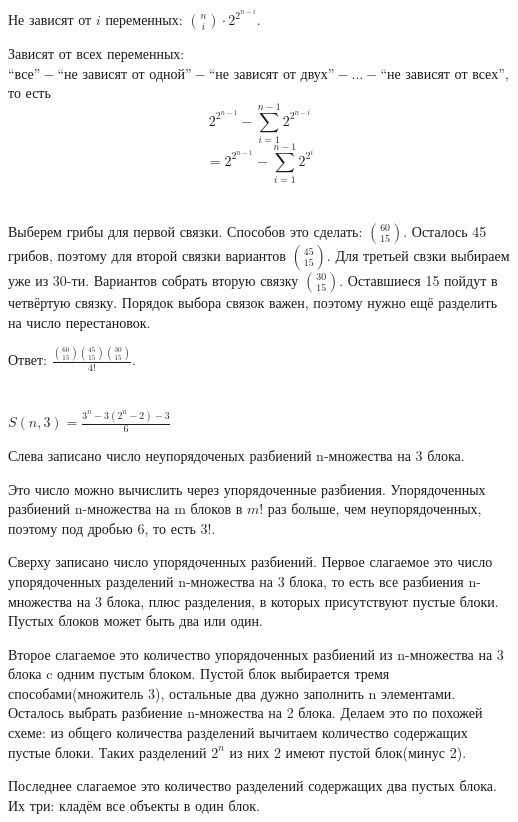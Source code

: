 \documentclass{article}
\begin{document}
Не зависят от $i$ переменных: ${n\choose i} \cdot 2^{2^{n-i}}$.

Зависят от всех переменных: $\text{``все''} - \text{``не зависят от одной''} -
\text{``не зависят от двух''} - \ldots - \text{``не зависят от всех''}$, то
есть $$2^{2^{n-1}}-\sum_{i=1}^{n-1}{2^{2^{n-i}}} $$ $$=
2^{2^{n-1}}-\sum_{i=1}^{n-1}{2^{2^{i}}}$$

\section{}

Выберем грибы для первой связки. Способов это сделать: ${60\choose
15}$.  Осталось 45 грибов, поэтому для второй связки вариантов
${45\choose 15}$.  Для третьей свзки выбираем уже из 30-ти. Вариантов
собрать вторую связку ${30\choose 15}$. Оставшиеся 15 пойдут в
четвёртую связку. Порядок выбора связок важен, поэтому нужно ещё
разделить на число перестановок.

Ответ: $\frac{{60\choose 15}{45\choose 15}{30\choose 15}}{4!}$.

\section{}

$S(n, 3) = \frac{3^n-3(2^n-2)-3}{6}$

Слева записано число неупорядоченых разбиений n-множества на 3 блока.

Это число можно вычислить через упорядоченные разбиения. Упорядоченных
разбиений n-множества на m блоков в $m!$ раз больше, чем
неупорядоченных, поэтому под дробью 6, то есть $3!$.

Сверху записано число упорядоченных разбиений. Первое слагаемое это
число упорядоченных разделений n-множества на 3 блока, то есть все
разбиения n-множества на 3 блока, плюс разделения, в которых
присутствуют пустые блоки. Пустых блоков может быть два или один.

Второе слагаемое это количество упорядоченных разбиений из n-множества
на 3 блока c одним пустым блоком. Пустой блок выбирается тремя
способами(множитель 3), остальные два дужно заполнить n элементами.
Осталось выбрать разбиение n-множества на 2 блока. Делаем это по
похожей схеме: из общего количества разделений вычитаем количество
содержащих пустые блоки. Таких разделений $2^n$ из них 2 имеют пустой
блок(минус 2).

Последнее слагаемое это количество разделений содержащих два пустых
блока. Их три: кладём все объекты в один блок.
\end{document}
